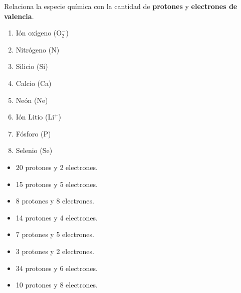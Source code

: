 \documentclass[11pt]{book}
\begin{document}
\begin{boxK}
  Relaciona la especie química con la cantidad de \textbf{protones} y \textbf{electrones de valencia}.\\

  \begin{minipage}{0.5\textwidth}
    \begin{enumerate}
      \item Ión oxígeno (O$_2^-$)
      \item Nitrógeno (N)
      \item Silicio (Si)
      \item Calcio (Ca)
      \item Neón (Ne)
      \item Ión Litio (Li$^+$)
      \item Fósforo (P)
      \item Selenio (Se)
    \end{enumerate}
  \end{minipage}%
  \begin{minipage}{0.5\textwidth}
    \begin{itemize}
      \item[\rule{1cm}{0.2mm}] 20 protones y 2 electrones.
      \item[\rule{1cm}{0.2mm}] 15 protones y 5 electrones.
      \item[\rule{1cm}{0.2mm}] 8 protones y 8 electrones.
      \item[\rule{1cm}{0.2mm}] 14 protones y 4 electrones.
      \item[\rule{1cm}{0.2mm}] 7 protones y 5 electrones.
      \item[\rule{1cm}{0.2mm}] 3 protones y 2 electrones.
      \item[\rule{1cm}{0.2mm}] 34 protones y 6 electrones.
      \item[\rule{1cm}{0.2mm}] 10 protones y 8 electrones.
    \end{itemize}
  \end{minipage}
\end{boxK}
\newpage
\end{document}
